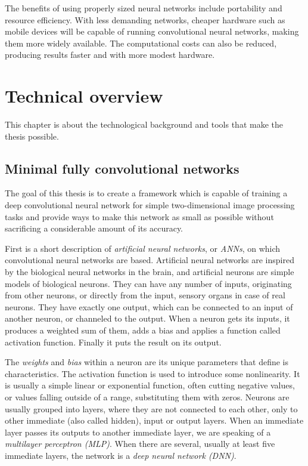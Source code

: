 \documentclass[12pt]{report}
\begin{document}
The benefits of using properly sized neural networks include portability and resource efficiency. With less demanding networks, cheaper hardware such as mobile devices will be capable of running convolutional neural networks, making them more widely available. The computational costs can also be reduced, producing results faster and with more modest hardware.

\chapter{Technical overview}
This chapter is about the technological background and tools that make the thesis possible.
\section{Minimal fully convolutional networks}
The goal of this thesis is to create a framework which is capable of training a deep convolutional neural network for simple two-dimensional image processing tasks and provide ways to make this network as small as possible without sacrificing a considerable amount of its accuracy.

First is a short description of \textit{artificial neural networks}, or \textit{ANNs}, on which convolutional neural networks are based. Artificial neural networks are inspired by the biological neural networks in the brain, and artificial neurons are simple models of biological neurons. They can have any number of inputs, originating from other neurons, or directly from the input, sensory organs in case of real neurons. They have exactly one output, which can be connected to an input of another neuron, or channeled to the output. When a neuron gets its inputs, it produces a weighted sum of them, adds a bias and applies a function called activation function. Finally it puts the result on its output.

The \textit{weights} and \textit{bias} within a neuron are its unique parameters that define is characteristics. The activation function is used to introduce some nonlinearity. It is usually a simple linear or exponential function, often cutting negative values, or values falling outside of a range, substituting them with zeros. Neurons are usually grouped into layers, where they are not connected to each other, only to other immediate (also called hidden), input or output layers. When an immediate layer passes its outputs to another immediate layer, we are speaking of a \textit{multilayer perceptron (MLP)}. When there are several, usually at least five immediate layers, the network is a \textit{deep neural network (DNN)}.
\end{document}
